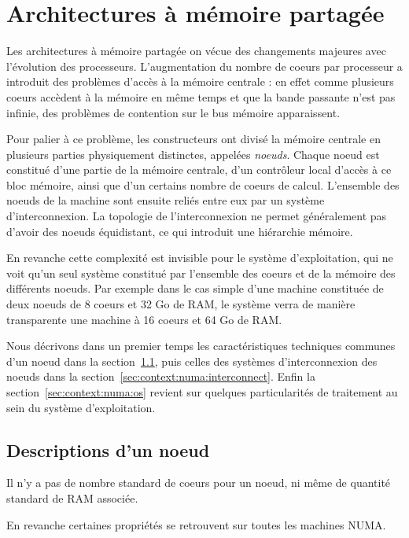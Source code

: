 \section{Architectures à mémoire partagée}\label{sec:context:numa}

Les architectures à mémoire partagée on vécue des changements majeures avec l'évolution des processeurs.
L'augmentation du nombre de coeurs par processeur a introduit des problèmes d'accès à la mémoire centrale : en effet comme plusieurs coeurs accèdent à la mémoire en même temps et que la bande passante n'est pas infinie, des problèmes de contention sur le bus mémoire apparaissent.

Pour palier à ce problème, les constructeurs ont divisé la mémoire centrale en plusieurs parties physiquement distinctes, appelées \emph{noeuds}.
Chaque noeud est constitué d'une partie de la mémoire centrale, d'un contrôleur local d'accès à ce bloc mémoire, ainsi que d'un certains nombre de coeurs de calcul.
L'ensemble des noeuds de la machine sont ensuite reliés entre eux par un système d'interconnexion.
La topologie de l'interconnexion ne permet généralement pas d'avoir des noeuds équidistant, ce qui introduit une hiérarchie mémoire.

En revanche cette complexité est invisible pour le système d'exploitation, qui ne voit qu'un seul système constitué par l'ensemble des coeurs et de la mémoire des différents noeuds.
Par exemple dans le cas simple d'une machine constituée de deux noeuds de 8 coeurs et 32 Go de RAM, le système verra de manière transparente une machine à 16 coeurs et 64 Go de RAM.

Nous décrivons dans un premier temps les caractéristiques techniques communes d'un noeud dans la section~\ref{sec:context:numa:node}, puis celles des systèmes d'interconnexion des noeuds dans la section~\ref{sec:context:numa:interconnect}.
Enfin la section~\ref{sec:context:numa:os} revient sur quelques particularités de traitement au sein du système d'exploitation.

\subsection{Descriptions d'un noeud}\label{sec:context:numa:node}

Il n'y a pas de nombre standard de coeurs pour un noeud, ni même de quantité standard de RAM associée.

En revanche certaines propriétés se retrouvent sur toutes les machines NUMA.


